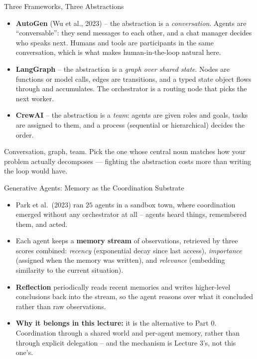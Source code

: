 \begin{frame}{Three Frameworks, Three Abstractions}
\small
\begin{itemize}
  \item \textbf{AutoGen} (Wu et al., 2023) -- the abstraction is a \emph{conversation}. Agents are ``conversable'': they send messages to each other, and a chat manager decides who speaks next. Humans and tools are participants in the same conversation, which is what makes human-in-the-loop natural here.
  \pause
  \item \textbf{LangGraph} -- the abstraction is a \emph{graph over shared state}. Nodes are functions or model calls, edges are transitions, and a typed state object flows through and accumulates. The orchestrator is a routing node that picks the next worker.
  \pause
  \item \textbf{CrewAI} -- the abstraction is a \emph{team}: agents are given roles and goals, tasks are assigned to them, and a process (sequential or hierarchical) decides the order.
\end{itemize}
\pause
\begin{rlintuition}
Conversation, graph, team. Pick the one whose central noun matches how your problem actually decomposes --- fighting the abstraction costs more than writing the loop would have.
\end{rlintuition}
\end{frame}

\begin{frame}{Generative Agents: Memory as the Coordination Substrate}
\begin{itemize}
  \item Park et al.\ (2023) ran $25$ agents in a sandbox town, where coordination emerged without any orchestrator at all -- agents heard things, remembered them, and acted.
  \pause
  \item Each agent keeps a \textbf{memory stream} of observations, retrieved by three scores combined: \emph{recency} (exponential decay since last access), \emph{importance} (assigned when the memory was written), and \emph{relevance} (embedding similarity to the current situation).
  \pause
  \item \textbf{Reflection} periodically reads recent memories and writes higher-level conclusions back into the stream, so the agent reasons over what it concluded rather than raw observations.
  \pause
  \item \textbf{Why it belongs in this lecture:} it is the alternative to Part 0. Coordination through a shared world and per-agent memory, rather than through explicit delegation -- and the mechanism is Lecture 3's, not this one's.
\end{itemize}
\end{frame}

